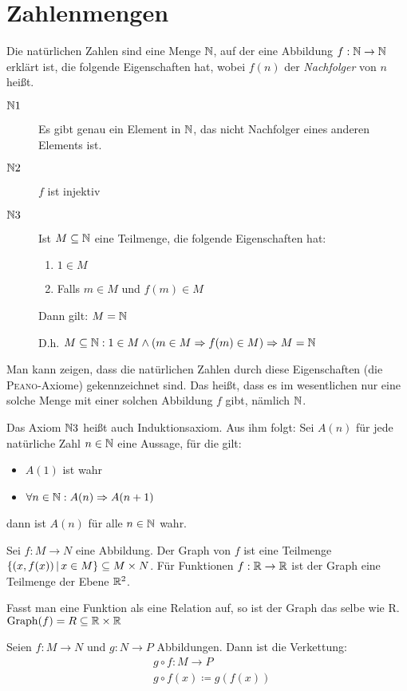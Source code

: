 \section{Zahlenmengen}
Die natürlichen Zahlen sind eine Menge $\mathbb{N}$, auf der eine Abbildung $f:\mathbb{N}\rightarrow\mathbb{N}$ erklärt ist, die folgende Eigenschaften hat, wobei $f(n)$ der \emph{Nachfolger} von $n$ heißt.
\begin{description}
  \item[$\mathbb{N} 1$] Es gibt genau ein Element in $\mathbb{N}$, das nicht Nachfolger eines anderen Elements ist.
  \item[$\mathbb{N} 2$] $f$ ist injektiv
  \item[$\mathbb{N} 3$] Ist $M\subseteq \mathbb{N}$ eine Teilmenge, die folgende Eigenschaften hat:
  \begin{enumerate}
    \item $1\in M$
    \item Falls $m\in M$ und $f(m)\in M$
  \end{enumerate}
  Dann gilt: $M = \mathbb{N}$

  D.h. $M\subseteq \mathbb{N} : 1\in M \wedge (m\in M \Rightarrow f(m)\in M) \Rightarrow M=\mathbb{N}$
\end{description}

Man kann zeigen, dass die natürlichen Zahlen durch diese Eigenschaften (die \textsc{Peano}-Axiome) gekennzeichnet sind. Das heißt, dass es im wesentlichen nur eine solche Menge mit einer solchen Abbildung $f$ gibt, nämlich $\mathbb{N}$.

Das Axiom $\mathbb{N} 3$ heißt auch Induktionsaxiom. Aus ihm folgt:
Sei $A(n)$ für jede natürliche Zahl $n \in\mathbb{N}$ eine Aussage, für die gilt:
\begin{itemize}
  \item $A(1)$ ist wahr
  \item $\forall n\in\mathbb{N} : A(n) \Rightarrow A(n+1)$
\end{itemize}
dann ist $A(n)$ für alle $n\in\mathbb{N}$ wahr.

Sei $f:M\rightarrow N$ eine Abbildung. Der Graph von $f$ ist eine Teilmenge $\left\{ (x,f(x)) \,\middle|\, x\in M \right\}\subseteq M\times N$.
Für Funktionen $f:\mathbb{R}\rightarrow\mathbb{R}$ ist der Graph eine Teilmenge der Ebene $\mathbb{R}^2$.

Fasst man eine Funktion als eine Relation auf, so ist der Graph das selbe wie R. $\mathrm{Graph}(f)=R\subseteq\mathbb{R}\times\mathbb{R}$

Seien $f:M\rightarrow N$ und $g:N\rightarrow P$ Abbildungen. Dann ist die Verkettung:
\begin{align*}
  &g\circ f:M\rightarrow P\\
  &g\circ f(x)\coloneqq g(f(x))
\end{align*}

